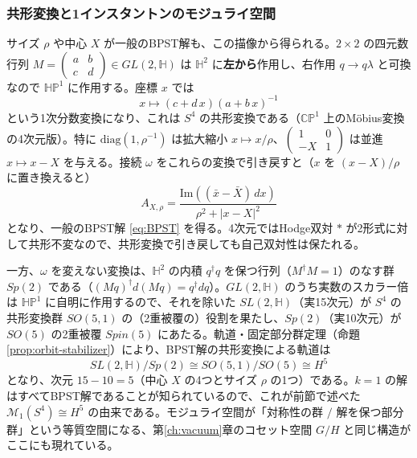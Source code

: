 \documentclass[uplatex, dvipdfmx, book]{jsbook}
\let\origsubsubsection\subsubsection
\renewcommand{\subsection}{\origsubsubsection}
\renewcommand{\subsubsection}{\paragraph}
\begin{document}
\subsection{共形変換と1インスタントンのモジュライ空間}

サイズ $\rho$ や中心 $X$ が一般のBPST解も、この描像から得られる。$2 \times 2$ の四元数行列 $M = \begin{pmatrix} a & b \\ c & d \end{pmatrix} \in GL(2, \mathbb{H})$ は $\mathbb{H}^2$ に\textbf{左から}作用し、右作用 $q \to q\lambda$ と可換なので $\mathbb{HP}^1$ に作用する。座標 $x$ では
\begin{equation}
    x \mapsto (c + d\,x)(a + b\,x)^{-1}
\end{equation}
という1次分数変換になり、これは $S^4$ の共形変換である（$\mathbb{CP}^1$ 上のMöbius変換の4次元版）。特に $\mathrm{diag}(1, \rho^{-1})$ は拡大縮小 $x \mapsto x/\rho$、$\begin{pmatrix} 1 & 0 \\ -X & 1 \end{pmatrix}$ は並進 $x \mapsto x - X$ を与える。接続 $\omega$ をこれらの変換で引き戻すと（$x$ を $(x - X)/\rho$ に置き換えると）
\begin{equation}
    A_{X, \rho} = \frac{\mathrm{Im}\left( (\bar{x} - \bar{X})\, dx \right)}{\rho^2 + |x - X|^2}
\end{equation}
となり、一般のBPST解 \eqref{eq:BPST} を得る。4次元ではHodge双対 $*$ が2形式に対して共形不変なので、共形変換で引き戻しても自己双対性は保たれる。

一方、$\omega$ を変えない変換は、$\mathbb{H}^2$ の内積 $q^\dagger q$ を保つ行列（$M^\dagger M = 1$）のなす群 $Sp(2)$ である（$(Mq)^\dagger d(Mq) = q^\dagger dq$）。$GL(2, \mathbb{H})$ のうち実数のスカラー倍は $\mathbb{HP}^1$ に自明に作用するので、それを除いた $SL(2, \mathbb{H})$（実15次元）が $S^4$ の共形変換群 $SO(5, 1)$ の（2重被覆の）役割を果たし、$Sp(2)$（実10次元）が $SO(5)$ の2重被覆 $Spin(5)$ にあたる。軌道・固定部分群定理（命題\ref{prop:orbit-stabilizer}）により、BPST解の共形変換による軌道は
\begin{equation}
    SL(2, \mathbb{H}) / Sp(2) \cong SO(5, 1)/SO(5) \cong H^5
\end{equation}
となり、次元 $15 - 10 = 5$（中心 $X$ の4つとサイズ $\rho$ の1つ）である。$k = 1$ の解はすべてBPST解であることが知られているので、これが前節で述べた $\mathcal{M}_1(S^4) \cong H^5$ の由来である。モジュライ空間が「対称性の群 $/$ 解を保つ部分群」という等質空間になる、第\ref{ch:vacuum}章のコセット空間 $G/H$ と同じ構造がここにも現れている。
\end{document}
